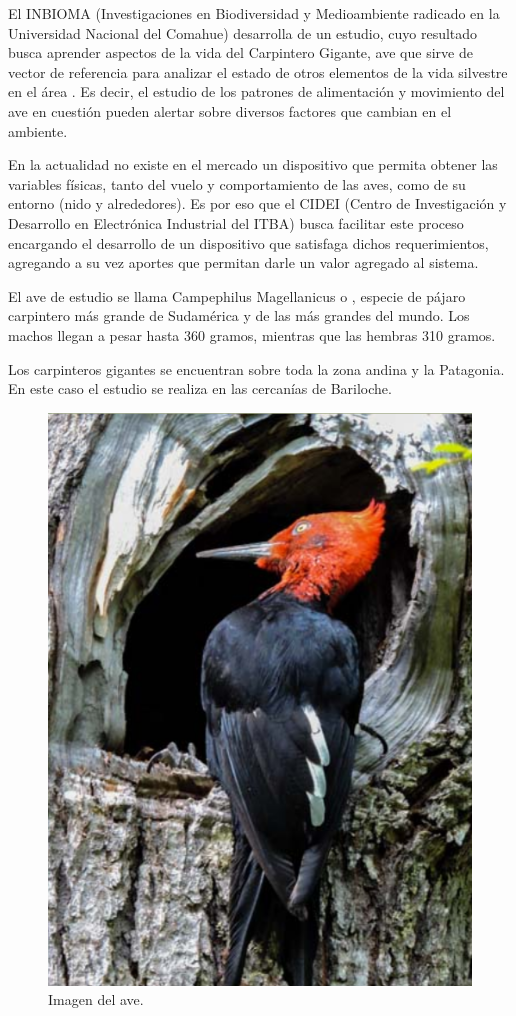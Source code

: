
El INBIOMA (Investigaciones en Biodiversidad y Medioambiente radicado en la Universidad Nacional del Comahue) desarrolla de un estudio, cuyo resultado busca aprender aspectos de la vida del Carpintero Gigante, ave que sirve de vector de referencia para analizar el estado de otros elementos de la vida silvestre en el área \cite{ref:PaperValeriaOjeda}. Es decir, el estudio de los patrones de alimentación y movimiento del ave en cuestión pueden alertar sobre diversos factores que cambian en el ambiente.

En la actualidad no existe en el mercado un dispositivo que permita obtener las variables físicas, tanto del vuelo y comportamiento de las aves, como de su entorno (nido y alrededores). Es por eso que el CIDEI (Centro de Investigación y Desarrollo en Electrónica Industrial del ITBA) busca facilitar este proceso encargando el desarrollo de un dispositivo que satisfaga dichos requerimientos, agregando a su vez aportes que permitan darle un valor agregado al sistema.


El ave de estudio se llama Campephilus Magellanicus o , especie de pájaro carpintero más grande de Sudamérica y de las más grandes del mundo. Los machos llegan a pesar hasta 360 gramos, mientras que las hembras 310 gramos.

Los carpinteros gigantes se encuentran sobre toda la zona andina y la Patagonia. En este caso el estudio se realiza en las cercanías de Bariloche. 
\begin{figure}[H]
	\centering
	\includegraphics[width=0.4\linewidth]{ImagenesIntroduccion/pajaro}
	\caption{Imagen del ave.}
	\label{fig:pajaro}
\end{figure}


